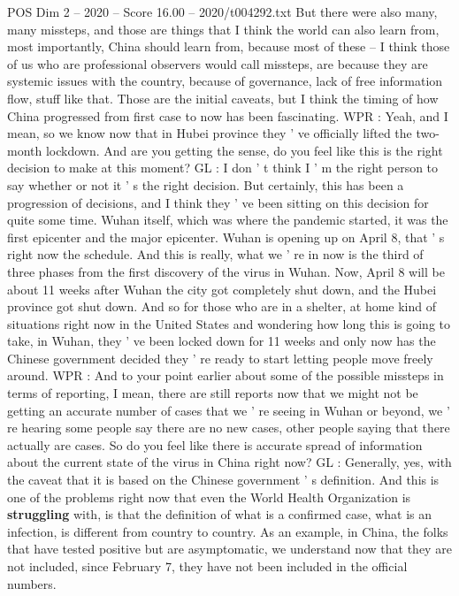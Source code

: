 \begin{textsample}{POS Dim 2 – 2020 – Score 16.00 – 2020/t004292.txt}
But there were also many, many missteps, and those are things that I think the world can also learn from, most importantly, China should learn from, because most of these -- I think those of us who are professional observers would call missteps, are because they are systemic issues with the country, because of governance, lack of free information flow, stuff like that.
Those are the initial caveats, but I think the timing of how China progressed from first case to now has been fascinating.
WPR : Yeah, and I mean, so we know now that in Hubei province they ' ve officially lifted the two-month lockdown.
And are you getting the sense, do you feel like this is the right decision to make at this moment?
GL : I don ' t think I ' m the right person to say whether or not it ' s the right decision.
But certainly, this has been a progression of decisions, and I think they ' ve been sitting on this decision for quite some time.
Wuhan itself, which was where the pandemic started, it was the first epicenter and the major epicenter.
Wuhan is opening up on April 8, that ' s right now the schedule.
And this is really, what we ' re in now is the third of three phases from the first discovery of the virus in Wuhan.
Now, April 8 will be about 11 weeks after Wuhan the city got completely shut down, and the Hubei province got shut down.
And so for those who are in a shelter, at home kind of situations right now in the United States and wondering how long this is going to take, in Wuhan, they ' ve been locked down for 11 weeks and only now has the Chinese government decided they ' re ready to start letting people move freely around.
WPR : And to your point earlier about some of the possible missteps in terms of reporting, I mean, there are still reports now that we might not be getting an accurate number of cases that we ' re seeing in Wuhan or beyond, we ' re hearing some people say there are no new cases, other people saying that there actually are cases.
So do you feel like there is accurate spread of information about the current state of the virus in China right now?
GL : Generally, yes, with the caveat that it is based on the Chinese government ' s definition.
And this is one of the problems right now that even the World Health Organization is \textbf{struggling} with, is that the definition of what is a confirmed case, what is an infection, is different from country to country.
As an example, in China, the folks that have tested positive but are asymptomatic, we understand now that they are not included, since February 7, they have not been included in the official numbers.

\end{textsample}
